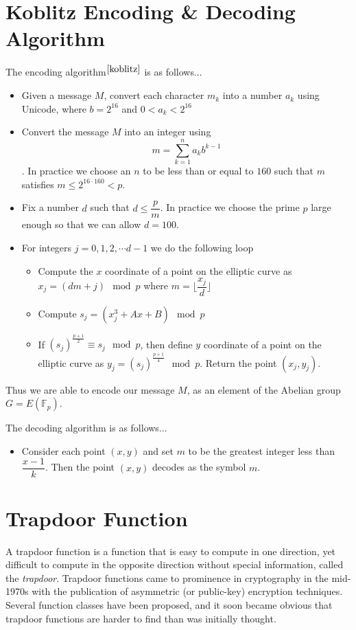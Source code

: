 \documentclass[a4paper,12pt]{article}
\begin{document}
\section{Koblitz Encoding \& Decoding Algorithm}
\begin{flushleft}
	The encoding algorithm$^{\cite{koblitz}}$ is as follows...\\
	\begin{itemize}
		\item Given a message $M$, convert each character $m_k$ into a number $a_k$ using Unicode, where $b=2^{16}$ and $0<a_k<2^{16}$
		\item Convert the message $M$ into an integer using $$m=\sum_{k=1}^n a_kb^{k-1}$$. In practice we choose an $n$ to be less than or equal to $160$ such that $m$ satisfies $m\le 2^{16\cdot 160}<p$.
		\item Fix a number $d$ such that $d\le \dfrac{p}{m}$. In practice we choose the prime $p$ large enough so that we can allow $d=100$.
		\item For integers $j=0,1,2,\cdots d-1$  we do the following loop
		\begin{itemize}
			\item Compute the $x$ coordinate of a point on the elliptic curve as $x_j=(dm+j)\mod p$ where $m=\bigg\lfloor{\dfrac{x_j}{d}}\bigg\rfloor$
			\item Compute $s_j=(x_j^3+Ax+B)\mod p$
			\item If $\left(s_j\right)^{\frac{p+1}{2}}\equiv s_j\mod p$, then define $y$ coordinate of a point on the elliptic curve as $y_j=\left(s_j\right)^{\frac{p+1}{4}}\mod p$. Return the point $(x_j,y_j)$.
		\end{itemize}
	\end{itemize}
	
	Thus we are able to encode our message $M$, as an element of the Abelian group $G=E\left(\mathbb{F}_p\right)$.
	
	The decoding algorithm is as follows...\\
	\begin{itemize}
	    \item Consider each point $(x,y)$ and set $m$ to be the greatest integer less than $\dfrac{x-1}k$. Then the point $(x,y)$ decodes as the symbol $m$. 
	\end{itemize}
\end{flushleft}

\section{Trapdoor Function}
\begin{flushleft}
A trapdoor function is a function that is easy to compute in one direction, yet difficult to compute in the opposite direction without special information, called the \textit{trapdoor}. Trapdoor functions came to prominence in cryptography in the mid-1970s with the publication of asymmetric (or public-key) encryption techniques. Several function classes have been proposed, and it soon became obvious that trapdoor functions are harder to find than was initially thought.
\end{flushleft}
\end{document}
